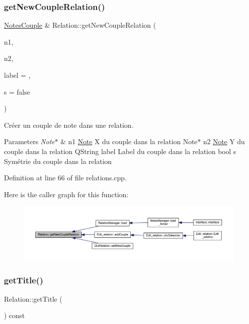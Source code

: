 \subsubsection{\texorpdfstring{get\+New\+Couple\+Relation()}{getNewCoupleRelation()}}
{\footnotesize\ttfamily \hyperlink{class_notes_couple}{Notes\+Couple} \& Relation\+::get\+New\+Couple\+Relation (\begin{DoxyParamCaption}\item[{\hyperlink{class_note}{Note} $\ast$}]{n1,  }\item[{\hyperlink{class_note}{Note} $\ast$}]{n2,  }\item[{Q\+String}]{label = {},  }\item[{bool}]{s = {\ttfamily false} }\end{DoxyParamCaption})}



Créer un couple de note dans une relation. 


\begin{DoxyParams}{Parameters}
{\em Note$\ast$} & n1 \hyperlink{class_note}{Note} X du couple dans la relation Note$\ast$ n2 \hyperlink{class_note}{Note} Y du couple dans la relation Q\+String label Label du couple dans la relation bool s Symétrie du couple dans la relation \\
\hline
\end{DoxyParams}


Definition at line 66 of file relations.\+cpp.

Here is the caller graph for this function\+:\nopagebreak
\begin{figure}[H]
\begin{center}
\leavevmode
\includegraphics[width=350pt]{class_relation_a69211cc18aed20c1df97c4b73317a2e1_icgraph}
\end{center}
\end{figure}
\mbox{\label{class_relation_aef1db31b9f1a2dc79a1688d4e466e2b1}} 
\subsubsection{\texorpdfstring{get\+Title()}{getTitle()}}
{\footnotesize\ttfamily Relation\+::get\+Title (\begin{DoxyParamCaption}{ }\end{DoxyParamCaption}) const\hspace{0.3cm}{\ttfamily [inline]}}



